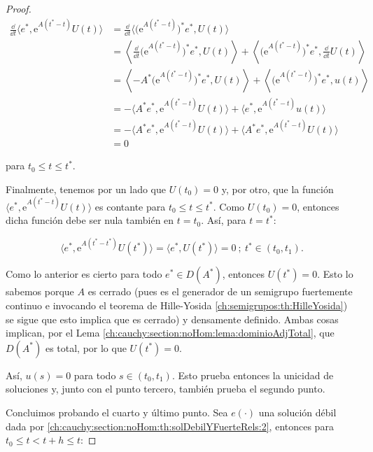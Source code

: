 \begin{proof}
    \begin{align*}
        \frac{\dd}{\dd t} \langle e^*, \mathrm{e}^{A(t^* - t)}U(t) \rangle &= \frac{\dd}{\dd t}\Big\langle \big(\mathrm{e}^{A(t^*-t)} \big)^*e^*,U(t)\Big\rangle \\
        &= \left \langle \frac{\dd}{\dd t}\big(\mathrm{e}^{A(t^*-t)} \big)^*e^*, U(t) \right \rangle + \left\langle \big(\mathrm{e}^{A(t^*-t)} \big)^*e^*,\frac{\dd}{\dd t}U(t)\right\rangle\\
        &= \left \langle - A^*\big(\mathrm{e}^{A(t^*-t)} \big)^*e^*, U(t) \right \rangle + \left\langle \big(\mathrm{e}^{A(t^*-t)} \big)^*e^*, u(t)\right\rangle \\
        &= - \langle A^* e^*, \mathrm{e}^{A(t^* - t)}U(t) \rangle + \langle e^*, \mathrm{e}^{A(t^* - t)} u(t) \rangle\\
        &= - \langle A^* e^*, \mathrm{e}^{A(t^* - t)}U(t) \rangle + \langle A^* e^*, \mathrm{e}^{A(t^* - t)} U(t) \rangle\\
        &= 0
    \end{align*}

    para $t_0 \leq t \leq t^*$.

    Finalmente, tenemos por un lado que $U(t_0) = 0$ y, por otro, que la función $\langle e^*, \mathrm{e}^{A(t^* - t)}U(t) \rangle$ es contante para $t_0 \leq t \leq t^*$. Como $U(t_0) = 0$, entonces dicha función debe ser nula también en $t = t_0$. Así, para $t = t^*$:

    \[\langle e^*, \mathrm{e}^{A(t^* - t^*)}U(t^*) \rangle = \langle e^*, U(t^*) \rangle = 0 \ ; \ t^* \in (t_0, t_1).\]

    Como lo anterior es cierto para todo $e^* \in D(A^*)$, entonces $U(t^*) =0$. Esto lo sabemos porque $A$ es cerrado (pues es el generador de un semigrupo fuertemente continuo e invocando el teorema de Hille-Yosida \eqref{ch:semigrupos:th:HilleYosida}) se sigue que esto implica que es cerrado) y densamente definido. Ambas cosas implican, por el Lema \eqref{ch:cauchy:section:noHom:lema:dominioAdjTotal}, que $D(A^*)$ es total, por lo que $U(t^*) = 0$.
    
    Así, $u(s) = 0$ para todo $s \in (t_0, t_1)$. Esto prueba entonces la unicidad de soluciones y, junto con el punto tercero, también prueba el segundo punto.

    Concluimos probando el cuarto y último punto. Sea $e(\cdot)$ una solución débil dada por \eqref{ch:cauchy:section:noHom:th:solDebilYFuerteRels:2}, entonces para $t_0 \leq t < t + h \leq t$:


\end{proof}
